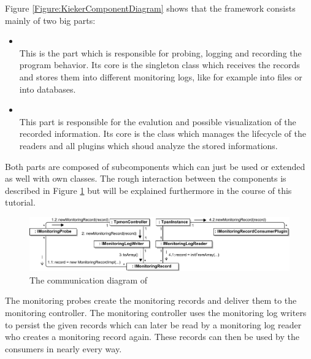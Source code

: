		Figure \ref{Figure:KiekerComponentDiagram} shows that the framework consists mainly of two big parts:
		\begin{itemize}
			\item \KiekerMonitoringPart\\
			This is the part which is responsible for probing, logging and recording the program behavior. Its core is the singleton class  \notify which receives the records and stores them into different monitoring logs, like for example into files or into databases.
			\item \KiekerAnalysisPart\\
			This part is responsible for the evalution and possible visualization of the recorded information. Its core is the class  \notify which manages the lifecycle of the readers and all plugins which shoud analyze the stored informations.
		\end{itemize}
		Both parts are composed of subcomponents which can just be used or extended as well with own classes. The rough interaction between the components is described in Figure \ref{Figure:KiekerCommunicationDiagram} but will be explained furthermore in the course of this tutorial.

		\begin{figure}[H]
			\begin{centering}
				\includegraphics[width=1\textwidth]{images/kiekerCommunications-revisedReArranged-woMonitoringLog-bw}
			\end{centering}
			\caption{The communication diagram of \Kieker}
			\label{Figure:KiekerCommunicationDiagram}
		\end{figure}
		
		\notify The monitoring probes create the monitoring records and deliver them to the monitoring controller. The monitoring controller uses the monitoring log writers to persist the given records which can later be read by a monitoring log reader who creates a monitoring record again. These records can then be used by the consumers in nearly every way.

